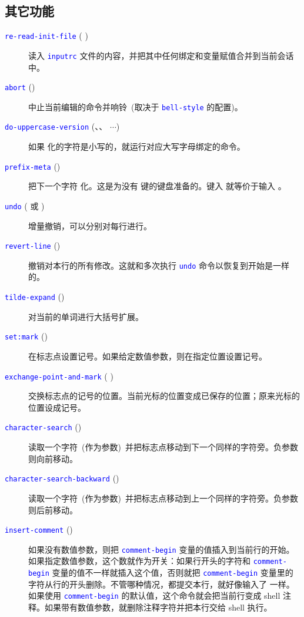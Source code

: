 \documentclass[openany,notitlepage]{book}
\newcommand{\code}[1]{\textcolor{blue}{{\tt #1}}}
\begin{document}
\begin{CJK}{UTF8}{song}
\subsection{其它功能} %
\begin{description}
    \item[\code{re-read-init-file} ( )] 读入 \code{inputrc} 文件的内容，并把其中任何绑定和变量赋值合并到当前会话中。
    \item[\code{abort} ()] 中止当前编辑的命令并响铃~(取决于 \code{bell-style} 的配置)。
    \item[\code{do-uppercase-version} (、、 $\cdots$)] 如果  化的字符是小写的，就运行对应大写字母绑定的命令。
    \item[\code{prefix-meta} ()] 把下一个字符  化。这是为没有  键的键盘准备的。键入  就等价于输入 。
    \item[\code{undo} ( 或  )] 增量撤销，可以分别对每行进行。
    \item[\code{revert-line} ()] 撤销对本行的所有修改。这就和多次执行 \code{undo} 命令以恢复到开始是一样的。
    \item[\code{tilde-expand} ()] 对当前的单词进行大括号扩展。
    \item[\code{set:mark} ()] 在标志点设置记号。如果给定数值参数，则在指定位置设置记号。
    \item[\code{exchange-point-and-mark} ( )] 交换标志点的记号的位置。当前光标的位置变成已保存的位置；原来光标的位置设成记号。
    \item[\code{character-search} (\keystroke{C-]})] 读取一个字符~(作为参数)~并把标志点移动到下一个同样的字符旁。负参数则向前移动。
    \item[\code{character-search-backward} (\keystroke{M-C-]})] 读取一个字符~(作为参数)~并把标志点移动到上一个同样的字符旁。负参数则后前移动。
    \item[\code{insert-comment} ()] 如果没有数值参数，则把 \code{comment-begin} 变量的值插入到当前行的开始。如果指定数值参数，这个数就作为开关：如果行开头的字符和 \code{comment-begin} 变量的值不一样就插入这个值，否则就把 \code{comment-begin} 变量里的字符从行的开头删除。不管哪种情况，都提交本行，就好像输入了  一样。如果使用 \code{comment-begin} 的默认值，这个命令就会把当前行变成 shell 注释。如果带有数值参数，就删除注释字符并把本行交给 shell 执行。

\end{description}
\end{CJK}
\end{document}
